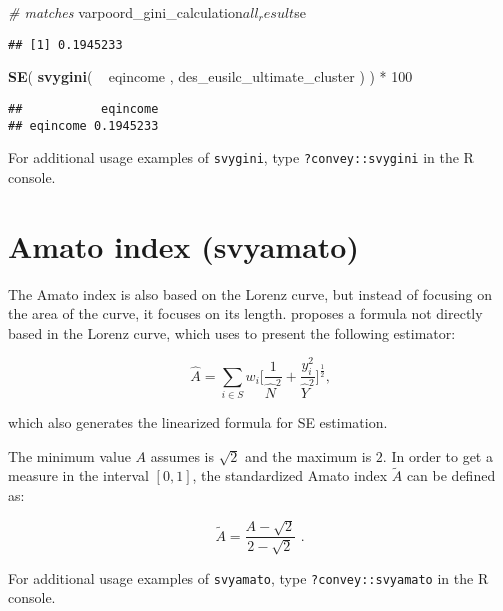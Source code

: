 \documentclass[]{book}
\newenvironment{Shaded}{\begin{snugshade}}{\end{snugshade}}
\newcommand{\KeywordTok}[1]{\textcolor[rgb]{0.13,0.29,0.53}{\textbf{{#1}}}}
\newcommand{\DecValTok}[1]{\textcolor[rgb]{0.00,0.00,0.81}{{#1}}}
\newcommand{\StringTok}[1]{\textcolor[rgb]{0.31,0.60,0.02}{{#1}}}
\newcommand{\CommentTok}[1]{\textcolor[rgb]{0.56,0.35,0.01}{\textit{{#1}}}}
\newcommand{\NormalTok}[1]{{#1}}
\begin{document}
\begin{Shaded}
\begin{Highlighting}[]
\CommentTok{# matches}
\NormalTok{varpoord_gini_calculation$all_result$se}
\end{Highlighting}
\end{Shaded}

\begin{verbatim}
## [1] 0.1945233
\end{verbatim}

\begin{Shaded}
\begin{Highlighting}[]
\KeywordTok{SE}\NormalTok{( }\KeywordTok{svygini}\NormalTok{( ~}\StringTok{ }\NormalTok{eqincome , des_eusilc_ultimate_cluster ) ) *}\StringTok{ }\DecValTok{100}
\end{Highlighting}
\end{Shaded}

\begin{verbatim}
##           eqincome
## eqincome 0.1945233
\end{verbatim}

For additional usage examples of \texttt{svygini}, type
\texttt{?convey::svygini} in the R console.

\section{Amato index (svyamato)}\label{amato-index-svyamato}

The Amato index is also based on the Lorenz curve, but instead of
focusing on the area of the curve, it focuses on its length.
\citep{arnold2012} proposes a formula not directly based in the Lorenz
curve, which \citep{barabesi2016} uses to present the following
estimator:

\[
\widehat{A} = \sum_{i \in S} w_i \bigg[ \frac{1}{\widehat{N}^2} + \frac{y_i^2}{\widehat{Y}^2} \bigg]^{\frac{1}{2}} \text{,}
\]

which also generates the linearized formula for SE estimation.

The minimum value \(A\) assumes is \(\sqrt{2}\) and the maximum is
\(2\). In order to get a measure in the interval \([0,1]\), the
standardized Amato index \(\widetilde{A}\) can be defined as:

\[
\widetilde{A} = \frac{ A - \sqrt{2} }{2 - \sqrt{2} } \text{ .}
\]

For additional usage examples of \texttt{svyamato}, type
\texttt{?convey::svyamato} in the R console.
\end{document}
